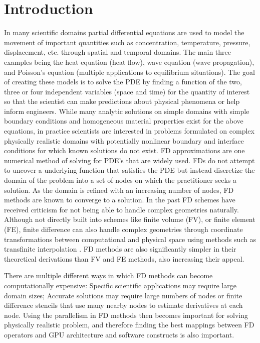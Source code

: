 \documentclass[conference]{IEEEtran}
\begin{document}
\section{Introduction}
In many scientific domains partial differential equations are used to model the movement of important quantities such as concentration, temperature, pressure, displacement, etc. through spatial and temporal domains. The main three examples being the heat equation (heat flow), wave equation (wave propagation), and Poisson's equation (multiple applications to equilibrium situations). The goal of creating these models is to solve the PDE by finding a function of the two, three or four independent variables (space and time) for the quantity of interest so that the scientist can make predictions about physical phenomena or help inform engineers. While many analytic solutions on simple domains with simple boundary conditions and homogeneous material properties exist for the above equations, in practice scientists are interested in problems formulated on complex physically realistic domains with potentially nonlinear boundary and interface conditions for which known solutions do not exist. FD approximations are one numerical method of solving for PDE's that are widely used. FDs do not attempt to uncover a underlying function that satisfies the PDE but instead discretize the domain of the problem into a set of nodes on which the practitioner seeks a solution. As the domain is refined with an increasing number of nodes, FD methods are known to converge to a solution. In the past FD schemes have received criticism for not being able to  handle complex geometries naturally. Although not directly built into schemes like finite volume (FV), or finite element (FE), finite difference can also handle complex geometries through coordinate transformations between computational and physical space using methods such as transfinite interpolation \cite{LeVeque}. FD methods are also significantly simpler in their theoretical derivations than FV and FE methods, also increasing their appeal.

There are multiple different ways in which FD methods can become computationally expensive:  Specific scientific applications may require large domain sizes; Accurate solutions may require large  numbers of nodes or  finite difference stencils that use many nearby nodes to estimate derivatives at each node.  Using the parallelism in FD methods then becomes important for solving physically realistic problem, and therefore finding the best mappings between FD operators and GPU architecture and software constructs is also important.
\end{document}
